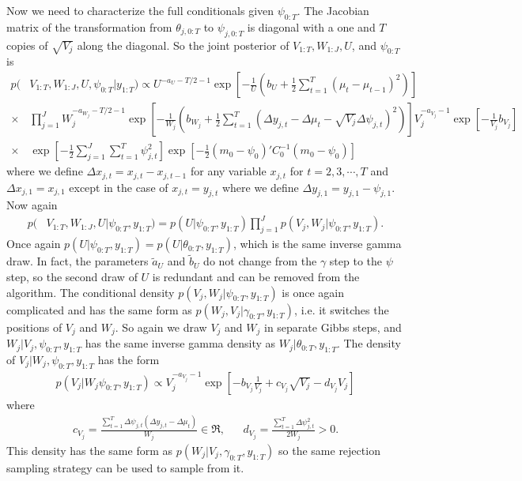 \documentclass[graybox]{svmult}
\begin{document}
Now we need to characterize the full conditionals given $\psi_{0:T}$. The Jacobian matrix of the transformation from $\theta_{j,0:T}$ to $\psi_{j,0:T}$ is diagonal with a one and $T$ copies of $\sqrt{V_j}$ along the diagonal. So the joint posterior of $V_{1:T},W_{1:J},U$, and $\psi_{0:T}$ is
\begin{align*}
p(&V_{1:T},W_{1:J},U,\psi_{0:T}|y_{1:T}) \propto U^{-a_U-T/2-1}\exp\left[-\frac{1}{U}\left(b_U + \frac{1}{2}\sum_{t=1}^T(\mu_t - \mu_{t-1})^2\right)\right]\\
\times& \prod_{j=1}^JW_j^{-a_{W_j}-T/2-1}\exp\left[-\frac{1}{W_j}\left(b_{W_j} + \frac{1}{2}\sum_{t=1}^T\left(\Delta y_{j,t} - \Delta\mu_{t} - \sqrt{V_j}\Delta\psi_{j,t}\right)^2\right)\right]V_j^{-a_{V_j}-1}\exp\left[-\frac{1}{V_j}b_{V_j}\right]\\
\times&\exp\left[-\frac{1}{2}\sum_{j=1}^J\sum_{t=1}^T\psi_{j,t}^2\right]\exp\left[-\frac{1}{2}(m_0 - \psi_0)'C_0^{-1}(m_0 - \psi_0)\right]
\end{align*}
where we define $\Delta x_{j,t}=x_{j,t} - x_{j,t-1}$ for any variable $x_{j,t}$ for $t=2,3,\cdots,T$ and $\Delta x_{j,1} = x_{j,1}$ except in the case of $x_{j,t}=y_{j,t}$ where we define $\Delta y_{j,1} = y_{j,1} - \psi_{j,1}$. Now again
\begin{align*}
p(&V_{1:T},W_{1:J},U|\psi_{0:T},y_{1:T})=p(U|\psi_{0:T},y_{1:T})\prod_{j=1}^Jp(V_j,W_j|\psi_{0:T},y_{1:T}).
\end{align*}
Once again $p(U|\psi_{0:T},y_{1:T})=p(U|\theta_{0:T},y_{1:T})$, which is the same inverse gamma draw. In fact, the parameters $\tilde{a}_{U}$ and $\tilde{b}_U$ do not change from the $\gamma$ step to the $\psi$ step, so the second draw of $U$ is redundant and can be removed from the algorithm. The conditional density $p(V_j,W_j|\psi_{0:T},y_{1:T})$ is once again complicated and has the same form as $p(W_j,V_j|\gamma_{0:T},y_{1:T})$, i.e. it switches the positions of $V_j$ and $W_j$. So again we draw $V_j$ and $W_j$ in separate Gibbs steps, and $W_j|V_j,\psi_{0:T},y_{1:T}$ has the same inverse gamma density as $W_j|\theta_{0:T},y_{1:T}$. The density of $V_j|W_j,\psi_{0:T},y_{1:T}$ has the form
\begin{align*}
p(V_j|W_j\psi_{0:T},y_{1:T}) \propto V_j^{-a_{V_j}-1}\exp\left[-b_{V_j}\frac{1}{V_j} + c_{V_j}\sqrt{V_j} - d_{V_j}V_j\right]
\end{align*}
where
\begin{align*}
c_{V_j}=\frac{\sum_{t=1}^T\Delta\psi_{j,t}(\Delta y_{j,t} - \Delta \mu_t)}{W_j}\in\Re,&&d_{V_j} = \frac{\sum_{t=1}^T\Delta \psi_{j,t}^2}{2W_j} >0.
\end{align*}
This density has the same form as $p(W_j|V_j,\gamma_{0:T},y_{1:T})$ so the same rejection sampling strategy can be used to sample from it.
\end{document}
